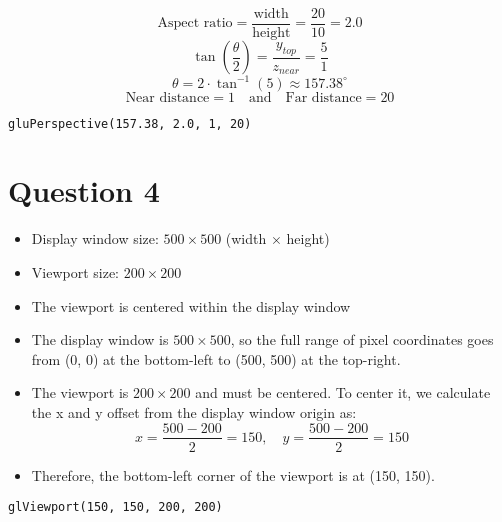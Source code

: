 \documentclass[12pt]{article}
\begin{document}
\[
\text{Aspect ratio} = \frac{\text{width}}{\text{height}} = \frac{20}{10} = 2.0
\]
\[
\tan\left(\frac{\theta}{2}\right) = \frac{y_{top}}{z_{near}} = \frac{5}{1}
\]
\[
\theta = 2 \cdot \tan^{-1}(5) \approx 157.38^\circ
\]
\[
\text{Near distance} = 1 \quad \text{and} \quad \text{Far distance} = 20
\]
\begin{verbatim}
gluPerspective(157.38, 2.0, 1, 20)
\end{verbatim}


\section*{Question 4}
\begin{itemize}
  \item Display window size: $500 \times 500$ (width $\times$ height)
  \item Viewport size: $200 \times 200$
  \item The viewport is centered within the display window
\end{itemize}

\medskip


\begin{itemize}
    \item The display window is $500 \times 500$, so the full range of pixel coordinates goes from (0, 0) at the bottom-left to (500, 500) at the top-right.
    \item The viewport is $200 \times 200$ and must be centered. To center it, we calculate the x and y offset from the display window origin as: 
    \[
    x = \frac{500 - 200}{2} = 150, \quad y = \frac{500 - 200}{2} = 150
    \]
    \item Therefore, the bottom-left corner of the viewport is at (150, 150).
\end{itemize}


\begin{verbatim}
glViewport(150, 150, 200, 200)
\end{verbatim}
\end{document}
